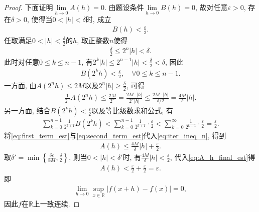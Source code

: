 \documentclass[../../main.tex]{subfiles}%
\begin{document}
\begin{proof}
下面证明$\lim\limits_{h \to 0} A(h) = 0$.
由题设条件$\lim\limits_{h \to 0} B(h) = 0$, 故对任意$\varepsilon > 0$, 存在$\delta > 0$, 使得当$0 < |h| < \delta$时, 成立
\begin{align*}
B(h) < \frac{\varepsilon}{2}.
\end{align*}
任取满足$0 < |h| < \frac{\delta}{2}$的$h$, 取正整数$n$使得
\begin{align*}
\frac{\delta}{2} \leqslant 2^n |h| < \delta.
\end{align*}
此时对任意$0 \leqslant k \leqslant n-1$, 有$2^k |h| \leqslant 2^{n-1} |h| < \frac{\delta}{2} < \delta$, 因此
\begin{align*}
B(2^k h) < \frac{\varepsilon}{2}, \quad \forall 0 \leqslant k \leqslant n-1.
\end{align*}
一方面, 由$A(2^n h) \leqslant 2M$以及$2^n |h| \geqslant \frac{\delta}{2}$, 可得
\begin{align}
\frac{1}{2^n} A(2^n h) \leqslant \frac{2M}{2^n} = \frac{2M \cdot |h|}{2^n |h|} \leqslant \frac{2M \cdot |h|}{\delta / 2} = \frac{4M}{\delta} |h|.
\label{eq:first_term_est}
\end{align}
另一方面, 结合$B(2^k h) < \frac{\varepsilon}{2}$以及等比级数求和公式, 有
\begin{align}
\sum\limits_{k=0}^{n-1} \frac{1}{2^{k+1}} B(2^k h)
< \sum\limits_{k=0}^{n-1} \frac{1}{2^{k+1}} \cdot \frac{\varepsilon}{2}
< \sum\limits_{k=0}^{\infty} \frac{1}{2^{k+1}} \cdot \frac{\varepsilon}{2}
= \frac{\varepsilon}{2}.
\label{eq:second_term_est}
\end{align}
将\eqref{eq:first_term_est}与\eqref{eq:second_term_est}代入\eqref{eq:iter_ineq_n}, 得到
\begin{align}
A(h) \leqslant \frac{4M}{\delta} |h| + \frac{\varepsilon}{2}.
\label{eq:A_h_final_est}
\end{align}
取$\delta' = \min\left\{ \frac{\delta \varepsilon}{8M}, \frac{\delta}{2} \right\}$, 则当$0 < |h| < \delta'$时, 有$\frac{4M}{\delta} |h| < \frac{\varepsilon}{2}$, 代入\eqref{eq:A_h_final_est}得
\begin{align*}
A(h) < \frac{\varepsilon}{2} + \frac{\varepsilon}{2} = \varepsilon.
\end{align*}
即
\begin{align*}
\lim\limits_{h \to 0} \sup_{x \in \mathbb{R}} \left| f(x+h) - f(x) \right| = 0,
\end{align*}
因此$f$在$\mathbb{R}$上一致连续.
\end{proof}
\end{document}

